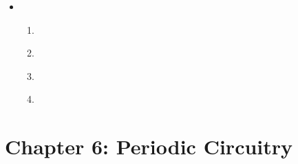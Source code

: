 \begin{multicols}{2}
\begin{itemize}[leftmargin=0em]
	\item[\bf\color{ocre}\sffamily\ref{exer:2_engine_corder_seed}]
	\begin{enumerate}[leftmargin=1.5em,label=\bf\color{ocre}(\alph*)]
		\item {} \\
		
		\item {} \\
		
		\item {} \\
		
		\item {} \\
	\end{enumerate}
\end{itemize}
\end{multicols}




\hypertarget{solutions_periodic_circuitry}{}\label{solutions_periodic_circuitry}
\section*{Chapter 6: Periodic Circuitry}
\renewcommand{\chapterfolder}{periodic_circuitry/}

